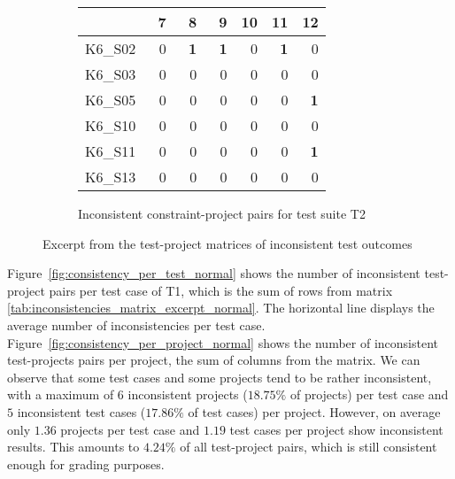 \begin{figure}[htpb]
\begin{subfigure}{.4\textwidth}
        \setlength{\tabcolsep}{0.2em}
        \tiny
        \begin{tabular}{l|rrrrrr}
            \toprule
                    & \ 7        & \ 8        & \ 9        & 10         & 11         & 12         \\
            \midrule
            K6\_S02 & 0          & \textbf{1} & \textbf{1} & 0          & \textbf{1} & 0          \\
            K6\_S03 & 0          & 0          & 0          & 0          & 0          & 0          \\
            K6\_S05 & 0          & 0          & 0          & 0          & 0          & \textbf{1} \\
            K6\_S10 & 0          & 0          & 0          & 0          & 0          & 0          \\
            K6\_S11 & 0          & 0          & 0          & 0          & 0          & \textbf{1} \\
            K6\_S13 & 0          & 0          & 0          & 0          & 0          & 0          \\
            \bottomrule
        \end{tabular}
        \caption{Inconsistent constraint-project pairs for test suite T2}
        \label{tab:inconsistencies_matrix_excerpt_constraint}
        \setlength{\tabcolsep}{\defaulttabcolsep}
    \end{subfigure}

    \vspace{-3\bigskipamount}
    \caption{Excerpt from the test-project matrices of inconsistent test outcomes}
    \label{tab:inconsistencies_matrices_excerpt}
\end{figure}

\noindent Figure~\ref{fig:consistency_per_test_normal} shows the number of inconsistent test-project pairs per test case of T1,
which is the sum of rows from matrix \ref{tab:inconsistencies_matrix_excerpt_normal}.
The horizontal line displays the average number of inconsistencies per test case.
Figure~\ref{fig:consistency_per_project_normal} shows the number of inconsistent test-projects pairs per project,
the sum of columns from the matrix.
We can observe that some test cases and some projects tend to be rather inconsistent,
with a maximum of $6$ inconsistent projects ($18.75\%$ of projects) per test case and $5$ inconsistent test cases ($17.86\%$ of test cases) per project.
However, on average only $1.36$ projects per test case and $1.19$ test cases per project show inconsistent results.
This amounts to $4.24\%$ of all test-project pairs, which is still consistent enough for grading purposes.
\parspace

